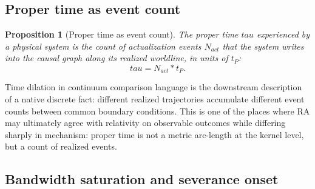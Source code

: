 \documentclass[11pt]{article}
\def\tau{tau}%
\def\mathrm#1{#1}%
\def\cdot{*}%
\newtheorem{proposition}{Proposition}
\begin{document}
\subsection{Proper time as event count}

\begin{proposition}[Proper time as event count]
\label{prop:proper_time}
The proper time $\tau$ experienced by a physical system is the count of actualization events $N_{\mathrm{act}}$ that the system writes into the causal graph along its realized worldline, in units of $t_P$:
\begin{equation}
\tau = N_{\mathrm{act}} \cdot t_P.
\end{equation}
\end{proposition}

Time dilation in continuum comparison language is the downstream description of a native discrete fact: different realized trajectories accumulate different event counts between common boundary conditions. This is one of the places where RA may ultimately agree with relativity on observable outcomes while differing sharply in mechanism: proper time is not a metric arc-length at the kernel level, but a count of realized events.

\subsection{Bandwidth saturation and severance onset}
\end{document}
